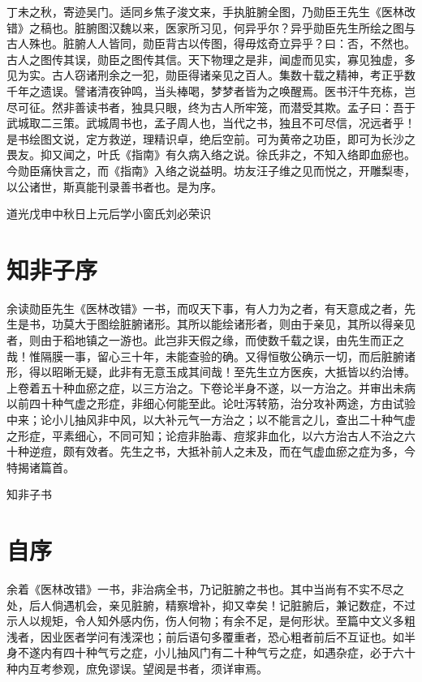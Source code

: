 \documentclass[a4paper,12pt,UTF8,twoside]{ctexbook}
\begin{document}
	
	丁未之秋，寄迹吴门。适同乡焦子浚文来，手执脏腑全图，乃勋臣王先生《医林改错》之稿也。脏腑图汉魏以来，医家所习见，何异乎尔？异乎勋臣先生所绘之图与古人殊也。脏腑人人皆同，勋臣背古以传图，得毋炫奇立异乎？曰：否，不然也。古人之图传其误，勋臣之图传其信。天下物理之是非，闻虚而见实，寡见独虚，多见为实。古人窃诸刑余之一犯，勋臣得诸亲见之百人。集数十载之精神，考正乎数千年之遗误。譬诸清夜钟鸣，当头棒喝，梦梦者皆为之唤醒焉。医书汗牛充栋，岂尽可征。然非善读书者，独具只眼，终为古人所牢笼，而潜受其欺。孟子曰：吾于武城取二三策。武城周书也，孟子周人也，当代之书，独且不可尽信，况远者乎！是书绘图文说，定方救逆，理精识卓，绝后空前。可为黄帝之功臣，即可为长沙之畏友。抑又闻之，叶氏《指南》有久病入络之说。徐氏非之，不知入络即血瘀也。今勋臣痛快言之，而《指南》入络之说益明。坊友汪子维之见而悦之，开雕梨枣，以公诸世，斯真能刊录善书者也。是为序。
	
	道光戊申中秋日上元后学小窗氏刘必荣识
	
	
	\chapter{知非子序}
	
	
	余读勋臣先生《医林改错》一书，而叹天下事，有人力为之者，有天意成之者，先生是书，功莫大于图绘脏腑诸形。其所以能绘诸形者，则由于亲见，其所以得亲见者，则由于稻地镇之一游也。此岂非天假之缘，而使数千载之误，由先生而正之哉！惟隔膜一事，留心三十年，未能查验的确。又得恒敬公确示一切，而后脏腑诸形，得以昭晰无疑，此非有无意玉成其间哉！至先生立方医疾，大抵皆以约治博。上卷着五十种血瘀之症，以三方治之。下卷论半身不遂，以一方治之。并审出未病以前四十种气虚之形症，非细心何能至此。论吐泻转筋，治分攻补两途，方由试验中来；论小儿抽风非中风，以大补元气一方治之；以不能言之儿，查出二十种气虚之形症，平素细心，不同可知；论痘非胎毒、痘浆非血化，以六方治古人不治之六十种逆痘，颇有效者。先生之书，大抵补前人之未及，而在气虚血瘀之症为多，今特揭诸篇首。
	
	知非子书
	
	\chapter{自序}
	
	
	余着《医林改错》一书，非治病全书，乃记脏腑之书也。其中当尚有不实不尽之处，后人倘遇机会，亲见脏腑，精察增补，抑又幸矣！记脏腑后，兼记数症，不过示人以规矩，令人知外感内伤，伤人何物；有余不足，是何形状。至篇中文义多粗浅者，因业医者学问有浅深也；前后语句多覆重者，恐心粗者前后不互证也。如半身不遂内有四十种气亏之症，小儿抽风门有二十种气亏之症，如遇杂症，必于六十种内互考参观，庶免谬误。望阅是书者，须详审焉。
	
\end{document}
